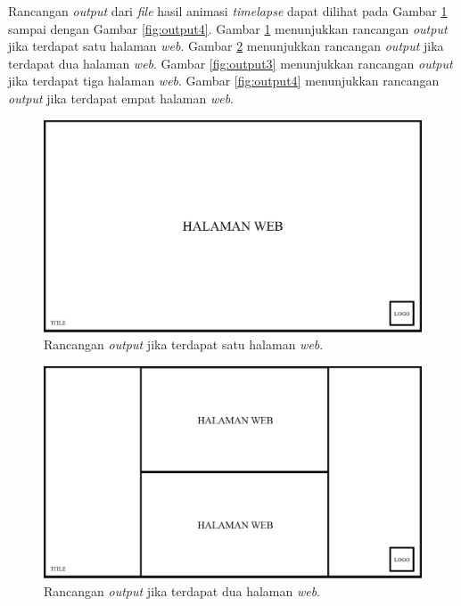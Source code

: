 Rancangan \textit{output} dari \textit{file} hasil animasi \textit{timelapse} dapat dilihat pada Gambar \ref{fig:output1} sampai dengan Gambar \ref{fig:output4}. Gambar \ref{fig:output1} menunjukkan rancangan \textit{output} jika terdapat satu halaman \textit{web}. Gambar \ref{fig:output2} menunjukkan rancangan \textit{output} jika terdapat dua halaman \textit{web}. Gambar \ref{fig:output3} menunjukkan rancangan \textit{output} jika terdapat tiga halaman \textit{web}. Gambar \ref{fig:output4} menunjukkan rancangan \textit{output} jika terdapat empat halaman \textit{web}. 

\begin{figure}[H]
	\centering
		\includegraphics[scale=0.3]{Gambar/output_1.png}
	\caption{Rancangan \textit{output} jika terdapat satu halaman \textit{web}.}
	\label{fig:output1}
\end{figure}

\begin{figure}[H]
	\centering
		\includegraphics[scale=0.3]{Gambar/output_2.png}
	\caption{Rancangan \textit{output} jika terdapat dua halaman \textit{web}.}
	\label{fig:output2}
\end{figure}

